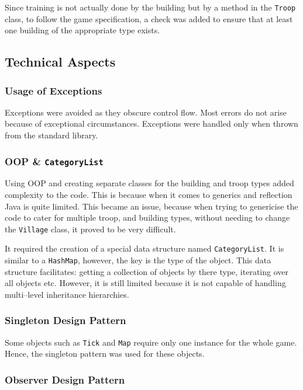 \documentclass[12pt]{article}
\begin{document}
Since training is not actually done by the building but by a
method in the \texttt{Troop} class, to follow the game
specification, a check was added to ensure that at least one
building of the appropriate type exists. 

\subsection{Technical Aspects}

\subsubsection{Usage of Exceptions}

Exceptions were avoided as they obscure control flow. Most
errors do not arise because of exceptional circumstances.
Exceptions were handled only when thrown from the standard
library.

\subsubsection{OOP \& \texttt{CategoryList}}

Using OOP and creating separate classes for the building and
troop types added complexity to the code. This is because when
it comes to generics and reflection Java is quite limited. This
became an issue, because when trying to genericise the code to
cater for multiple troop, and building types, without needing to
change the \texttt{Village} class, it proved to be very
difficult.

It required the creation of a special data structure named
\texttt{CategoryList}. It is similar to a \texttt{HashMap},
however, the key is the type of the object. This data structure
facilitates: getting a collection of objects by there type,
iterating over all objects etc. However, it is still limited
because it is not capable of handling multi--level inheritance
hierarchies.

\subsubsection{Singleton Design Pattern}

Some objects such as \texttt{Tick} and \texttt{Map} require only
one instance for the whole game. Hence, the singleton pattern
was used for these objects.

\subsubsection{Observer Design Pattern}
\end{document}
